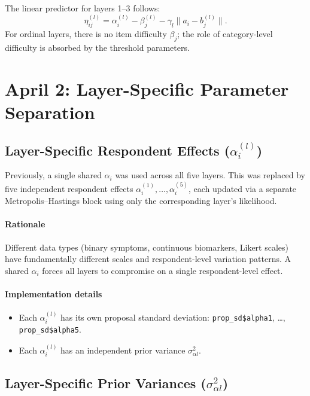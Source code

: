 \documentclass[11pt]{article}
\begin{document}
The linear predictor for layers 1--3 follows:
\[
  \eta_{ij}^{(l)} = \alpha_i^{(l)} - \beta_j^{(l)} - \gamma_l \| a_i - b_j^{(l)} \|.
\]
For ordinal layers, there is no item difficulty $\beta_j$; the role of category-level difficulty is absorbed by the threshold parameters.


\section{April 2: Layer-Specific Parameter Separation}

\subsection{Layer-Specific Respondent Effects ($\alpha_i^{(l)}$)}

Previously, a single shared $\alpha_i$ was used across all five layers.
This was replaced by five independent respondent effects $\alpha_i^{(1)}, \dots, \alpha_i^{(5)}$, each updated via a separate Metropolis--Hastings block using only the corresponding layer's likelihood.

\paragraph{Rationale}
Different data types (binary symptoms, continuous biomarkers, Likert scales) have fundamentally different scales and respondent-level variation patterns.
A shared $\alpha_i$ forces all layers to compromise on a single respondent-level effect.

\paragraph{Implementation details}
\begin{itemize}[leftmargin=1.5em]
  \item Each $\alpha_i^{(l)}$ has its own proposal standard deviation: \lstinline{prop_sd$alpha1}, \dots, \lstinline{prop_sd$alpha5}.
  \item Each $\alpha_i^{(l)}$ has an independent prior variance $\sigma_{\alpha l}^2$.
\end{itemize}

\subsection{Layer-Specific Prior Variances ($\sigma_{\alpha l}^2$)}
\end{document}
